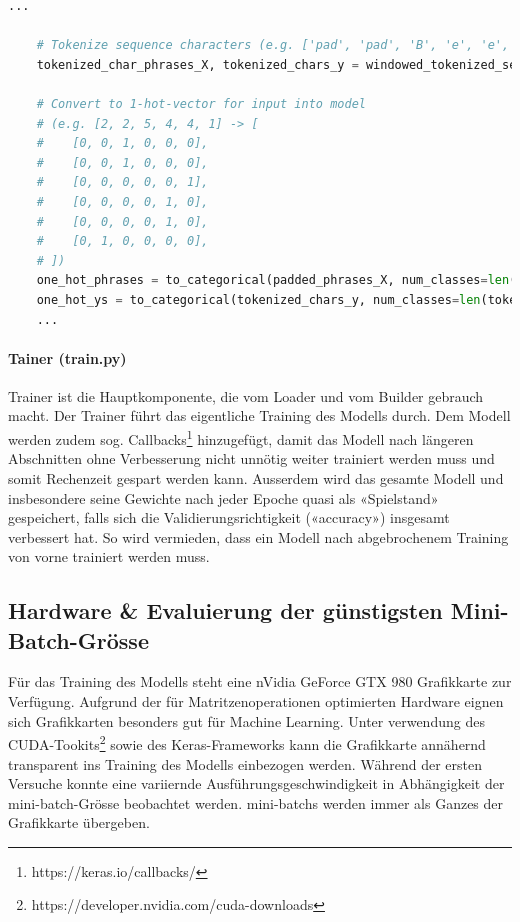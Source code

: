 \begin{lstlisting}[language=Python, caption=Encodierung von Zeichen bis One-Hot-Vektor, label=lst:one-hot-encoding]
    ...

    # Tokenize sequence characters (e.g. ['pad', 'pad', 'B', 'e', 'e', 'r'] -> [2, 2, 5, 4, 4, 1])
    tokenized_char_phrases_X, tokenized_chars_y = windowed_tokenized_sequences[:, :-1], windowed_tokenized_sequences[:, -1]

    # Convert to 1-hot-vector for input into model
    # (e.g. [2, 2, 5, 4, 4, 1] -> [
    #    [0, 0, 1, 0, 0, 0],
    #    [0, 0, 1, 0, 0, 0],
    #    [0, 0, 0, 0, 0, 1],
    #    [0, 0, 0, 0, 1, 0],
    #    [0, 0, 0, 0, 1, 0],
    #    [0, 1, 0, 0, 0, 0],
    # ])
    one_hot_phrases = to_categorical(padded_phrases_X, num_classes=len(tokenizer.index_word) + 1)
    one_hot_ys = to_categorical(tokenized_chars_y, num_classes=len(tokenizer.index_word) + 1)
    ...
\end{lstlisting}


\paragraph{Tainer (train.py)} Trainer ist die Hauptkomponente, die vom Loader und vom Builder gebrauch macht.
Der Trainer führt das eigentliche Training des Modells durch.
Dem Modell werden zudem sog. Callbacks\footnote{https://keras.io/callbacks/} hinzugefügt, damit das Modell nach
längeren Abschnitten ohne Verbesserung nicht unnötig weiter trainiert werden muss und somit Rechenzeit gespart werden kann.
Ausserdem wird das gesamte Modell und insbesondere seine Gewichte nach jeder Epoche quasi als «Spielstand» gespeichert,
falls sich die Validierungsrichtigkeit («\gls{accuracy}») insgesamt verbessert hat.
So wird vermieden, dass ein Modell nach abgebrochenem Training von vorne trainiert werden muss.

\subsection{Hardware \& Evaluierung der günstigsten Mini-Batch-Grösse}
\label{sec:evaluating-fastest-batchsize}
Für das Training des Modells steht eine nVidia GeForce GTX 980 Grafikkarte zur Verfügung.
Aufgrund der für Matritzenoperationen optimierten Hardware eignen sich Grafikkarten besonders gut für Machine Learning.
Unter verwendung des CUDA-Tookits\footnote{https://developer.nvidia.com/cuda-downloads} sowie des Keras-Frameworks kann
die Grafikkarte annähernd transparent ins Training des Modells einbezogen werden.
Während der ersten Versuche konnte eine variiernde Ausführungsgeschwindigkeit in Abhängigkeit der \gls{mini-batch}-Grösse beobachtet werden.
\glspl{mini-batch} werden immer als Ganzes der Grafikkarte übergeben.

